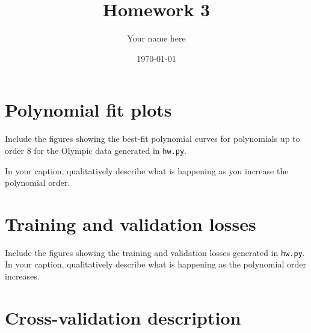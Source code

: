 \documentclass[11pt]{article}
\title{Homework 3}
\author{Your name here}
\date{\today{}}
\begin{document}
\maketitle

\section{Polynomial fit plots}

Include the figures showing the best-fit polynomial curves for polynomials up
to order 8 for the Olympic data generated in \texttt{hw.py}.

In your caption, qualitatively describe what is happening as
you increase the polynomial order.


\section{Training and validation losses}

Include the figures showing the training and validation losses generated in
\texttt{hw.py}. In your caption, qualitatively describe what is happening as
the polynomial order increases.


\section{Cross-validation description}
\end{document}
